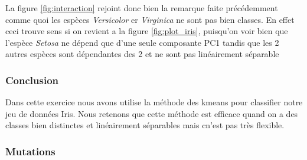 \documentclass[10pt]{article}
\begin{document}
La figure \ref{fig:interaction} rejoint donc bien la remarque faite précédemment comme quoi les espèces \textit{Versicolor} er \textit{Virginica} ne sont pas bien classes. En effet ceci trouve sens si on revient a la figure \ref{fig:plot_iris}, puisqu'on voir bien que l'espèce \textit{Setosa} ne dépend que d'une seule composante PC1 tandis que les 2 autres espèces sont dépendantes des 2 et ne sont pas linéairement séparable
\subsubsection{Conclusion}
Dans cette exercice nous avons utilise la méthode des kmeans pour classifier notre jeu de données Iris. Nous retenons que cette méthode est efficace quand on a des classes bien distinctes et linéairement séparables mais cn'est pas très flexible.



\subsubsection{Mutations}
\end{document}
